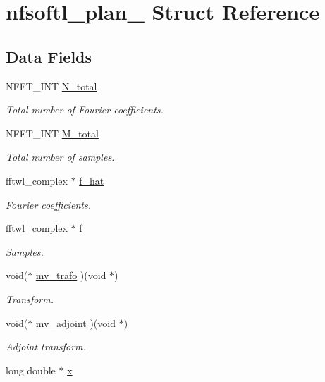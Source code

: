 \hypertarget{structnfsoftl__plan__}{\section{nfsoftl\-\_\-plan\-\_\- Struct Reference}
\label{structnfsoftl__plan__}
}
\subsection*{Data Fields}
\begin{DoxyCompactItemize}
\item 
N\-F\-F\-T\-\_\-\-I\-N\-T \hyperlink{structnfsoftl__plan___aa0655ed287e448f93827572cec3c90c9}{N\-\_\-total}
\begin{DoxyCompactList}\small\item\em Total number of Fourier coefficients. \end{DoxyCompactList}\item 
N\-F\-F\-T\-\_\-\-I\-N\-T \hyperlink{structnfsoftl__plan___a376e6b85b55fc057e94823eef19e15b7}{M\-\_\-total}
\begin{DoxyCompactList}\small\item\em Total number of samples. \end{DoxyCompactList}\item 
fftwl\-\_\-complex $\ast$ \hyperlink{structnfsoftl__plan___ab280522456fe4f49ccb91d4aa195702d}{f\-\_\-hat}
\begin{DoxyCompactList}\small\item\em Fourier coefficients. \end{DoxyCompactList}\item 
fftwl\-\_\-complex $\ast$ \hyperlink{structnfsoftl__plan___a62073b403c90aa2b527d5f62f190112e}{f}
\begin{DoxyCompactList}\small\item\em Samples. \end{DoxyCompactList}\item 
void($\ast$ \hyperlink{structnfsoftl__plan___aeab94862046b7688470f3f1d78ca927d}{mv\-\_\-trafo} )(void $\ast$)
\begin{DoxyCompactList}\small\item\em Transform. \end{DoxyCompactList}\item 
void($\ast$ \hyperlink{structnfsoftl__plan___a2f7123e0975b4a7cd693d01abf117949}{mv\-\_\-adjoint} )(void $\ast$)
\begin{DoxyCompactList}\small\item\em Adjoint transform. \end{DoxyCompactList}\item 
\hypertarget{structnfsoftl__plan___a92211c64713d72c3d3cf45ac39601214}{long double $\ast$ \hyperlink{structnfsoftl__plan___a92211c64713d72c3d3cf45ac39601214}{x}}\label{structnfsoftl__plan___a92211c64713d72c3d3cf45ac39601214}


\end{DoxyCompactItemize}
